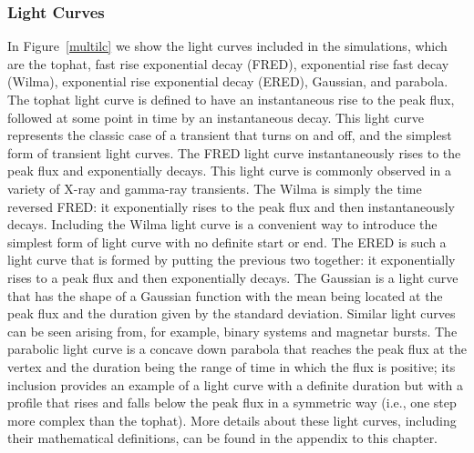 \documentclass[12pt]{article}
\begin{document}
\subsubsection{Light Curves}
In Figure~\ref{multilc} we show the light curves included in the simulations, which are the tophat, fast rise exponential decay (FRED), exponential rise fast decay (Wilma), exponential rise exponential decay (ERED), Gaussian, and parabola. The tophat light curve is defined to have an instantaneous rise to the peak flux, followed at some point in time by an instantaneous decay. This light curve represents the classic case of a transient that turns on and off, and the simplest form of transient light curves. The FRED light curve instantaneously rises to the peak flux and exponentially decays. This light curve is commonly observed in a variety of X-ray and gamma-ray transients. The Wilma is simply the time reversed FRED: it exponentially rises to the peak flux and then instantaneously decays. Including the Wilma light curve is a convenient way to introduce the simplest form of light curve with no definite start or end. The ERED is such a light curve that is formed by putting the previous two together: it exponentially rises to a peak flux and then exponentially decays. The Gaussian is a light curve that has the shape of a Gaussian function with the mean being located at the peak flux and the duration given by the standard deviation. Similar light curves can be seen arising from, for example, binary systems and magnetar bursts.  The parabolic light curve is a concave down parabola that reaches the peak flux at the vertex and the duration being the range of time in which the flux is positive; its inclusion provides an example of a light curve with a definite duration but with a profile that rises and falls below the peak flux in a symmetric way (i.e., one step more complex than the tophat). More details about these light curves, including their mathematical definitions, can be found in the appendix to this chapter.
\end{document}
